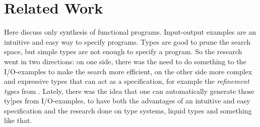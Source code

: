 \chapter{Related Work} \label{ch:relatedwork}

Here discuss only synthesis of functional programs. Input-output examples are an intuitive and easy way to specify programs. Types are good to prune the search space, but simple types are not enough to specify a program. So the research went in two directions: on one side, there was the need to do something to the I/O-examples to make the search more efficient, on the other side more complex and expressive types that can act as a specification, for example the \emph{refinement types} from \cite{SynquidPaper}. Lately, there was the idea that one can automatically generate those ty[pes from I/O-examples, to have both the advantages of an intuitive and easy specification and the research done on type systems, liquid types and something like that.


